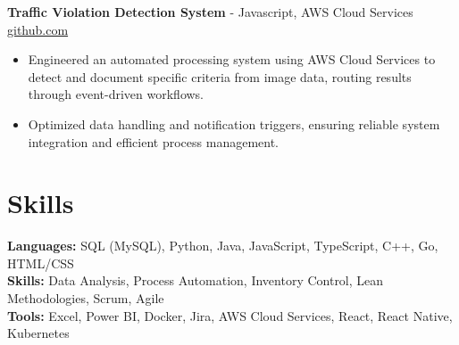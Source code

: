 \documentclass[11pt]{article}       %
\begin{document}
\textbf{Traffic Violation Detection System}{ - Javascript, AWS Cloud Services} \hfill \href{https://github.com/Monica20030707/AWS_rekonigition-N-read-database}{github.com} \\
\vspace{-9pt}
\begin{itemize}
  \item Engineered an automated processing system using AWS Cloud Services to detect and document specific criteria from image data, routing results through event-driven workflows.
  \item Optimized data handling and notification triggers, ensuring reliable system integration and efficient process management.
\end{itemize}

\vspace{-18.5pt}


\section*{Skills}
\textbf{Languages:} SQL (MySQL), Python, Java, JavaScript, TypeScript, C++, Go, HTML/CSS\\
\textbf{Skills:} Data Analysis, Process Automation, Inventory Control, Lean Methodologies, Scrum, Agile\\
\textbf{Tools:} Excel, Power BI, Docker, Jira, AWS Cloud Services, React, React Native, Kubernetes\\

\vspace{-6.5pt}
\end{document}
